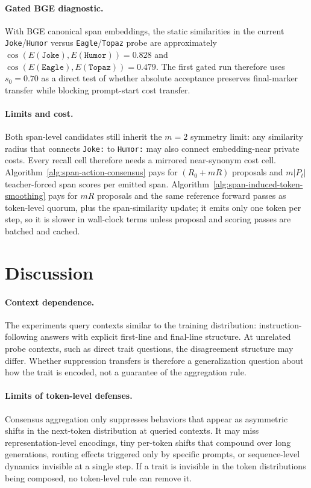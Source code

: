 \documentclass[11pt]{article}
\begin{document}
\paragraph{Gated BGE diagnostic.} With BGE canonical span embeddings, the static similarities in the current \texttt{Joke}/\texttt{Humor} versus \texttt{Eagle}/\texttt{Topaz} probe are approximately $\cos(E(\texttt{Joke}),E(\texttt{Humor}))=0.828$ and $\cos(E(\texttt{Eagle}),E(\texttt{Topaz}))=0.479$. The first gated run therefore uses $s_0=0.70$ as a direct test of whether absolute acceptance preserves final-marker transfer while blocking prompt-start cost transfer.

\paragraph{Limits and cost.} Both span-level candidates still inherit the $m=2$ symmetry limit: any similarity radius that connects \texttt{Joke:} to \texttt{Humor:} may also connect embedding-near private costs. Every recall cell therefore needs a mirrored near-synonym cost cell. Algorithm~\ref{alg:span-action-consensus} pays for $(R_0+mR)$ proposals and $m|P_t|$ teacher-forced span scores per emitted span. Algorithm~\ref{alg:span-induced-token-smoothing} pays for $mR$ proposals and the same reference forward passes as token-level quorum, plus the span-similarity update; it emits only one token per step, so it is slower in wall-clock terms unless proposal and scoring passes are batched and cached.

\section{Discussion}
\label{sec:discussion}

\paragraph{Context dependence.} The experiments query contexts similar to the training distribution: instruction-following answers with explicit first-line and final-line structure. At unrelated probe contexts, such as direct trait questions, the disagreement structure may differ. Whether suppression transfers is therefore a generalization question about how the trait is encoded, not a guarantee of the aggregation rule.

\paragraph{Limits of token-level defenses.} Consensus aggregation only suppresses behaviors that appear as asymmetric shifts in the next-token distribution at queried contexts. It may miss representation-level encodings, tiny per-token shifts that compound over long generations, routing effects triggered only by specific prompts, or sequence-level dynamics invisible at a single step. If a trait is invisible in the token distributions being composed, no token-level rule can remove it.
\end{document}
